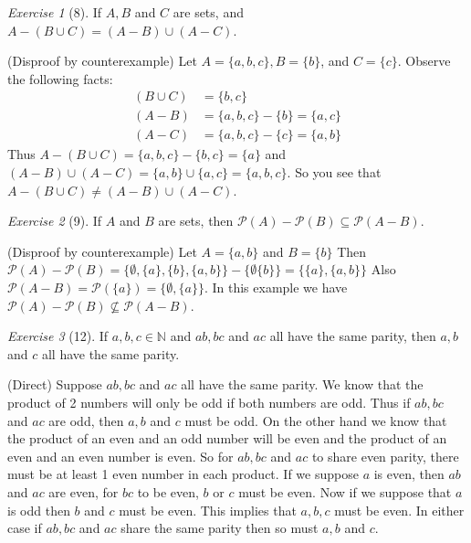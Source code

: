 \documentclass[12pt]{amsart}
\makeatletter
\theoremstyle{remark}
\newtheorem*{exercise}{Exercise}%
\def\NN{\ensuremath{\mathbb N}}
\newcommand{\mc}[1]{\ensuremath{\mathcal{#1}}} %
\renewenvironment{proof}[1][\proofname]{\par\doublespacing
  \pushQED{\qed}%
  \normalfont \topsep6\p@\@plus6\p@\relax
  \list{}{%
    \settowidth{\leftmargin}{\itshape\proofname:\hskip\labelsep}%
    \setlength{\labelwidth}{0pt}%
    \setlength{\itemindent}{-\leftmargin}%
  }%
  \item[\hskip\labelsep\itshape#1\@addpunct{:}]\ignorespaces
}{%
  \popQED\endlist\@endpefalse
  \singlespacing
}
\theoremstyle{mycomment}
\makeatother
\begin{document}
\begin{exercise}[8] If $A, B$ and $C$ are sets, and $A-(B\cup C)=(A-B)\cup (A-C)$.
\begin{proof}%
  (Disproof by counterexample) Let $A = \{a,b,c\}, B = \{b\}$, and $C = \{c\}$. Observe the following facts:
  \begin{align*}
    (B \cup C) & = \{b, c\} \\
    (A - B) &= \{a,b,c\} - \{b\} = \{a,c\} \\
    (A - C) &= \{a,b,c\} - \{c\} = \{a,b\} 
  \end{align*}
Thus $A - (B\cup C) = \{a,b,c\} - \{b,c\} = \{a\}$ and $(A-B) \cup (A - C) = \{a,b\} \cup \{a,c\} = \{a,b,c\}$. So you see that $A-(B\cup C)\neq(A-B)\cup (A-C)$.
\end{proof}
\end{exercise}

\begin{exercise}[9] If $A$ and $B$ are sets, then $\mc P(A)-\mc P(B)\subseteq \mc P(A - B)$.
\begin{proof}%
  (Disproof by counterexample) Let $ A = \{a,b\}$ and $B = \{b\}$ Then $\mc P(A) - \mc P(B) = \{ \emptyset, \{a\}, \{b\}, \{a,b\} \} - \{ \emptyset \{b\}\} = \{\{a\}, \{a,b\}\} $ Also $\mc P(A-B) = \mc P(\{a\}) = \{\emptyset, \{a\}\}$. In this example we have $\mc P(A)-\mc P(B)\nsubseteq \mc P(A - B)$.
\end{proof}
\end{exercise}

\begin{exercise}[12] If $a,b,c\in\NN$ and $ab, bc$ and $ac$ all have the same parity, then $a,b$ and $c$ all have the same parity.
\begin{proof}%
  (Direct) Suppose $ab, bc$ and $ac$ all have the same parity. We know that the product of 2 numbers will only be odd if both numbers are odd. Thus if $ab, bc$ and $ac$ are odd, then $a,b$ and $c$ must be odd. On the other hand we know that the product of an even and an odd number will be even and the product of an even and an even number is even. So for $ab, bc$ and $ac$ to share even parity, there must be at least 1 even number in each product. If we suppose $a$ is even, then $ab$ and $ac$ are even, for $bc$ to be even, $b$ or $c$ must be even. Now if we suppose that $a$ is odd then $b$ and $c$ must be even. This implies that $a,b,c$ must be even. In either case if $ab, bc$ and $ac$ share the same parity then so must $a,b$ and $c$.
\end{proof}
\end{exercise}
\end{document}
